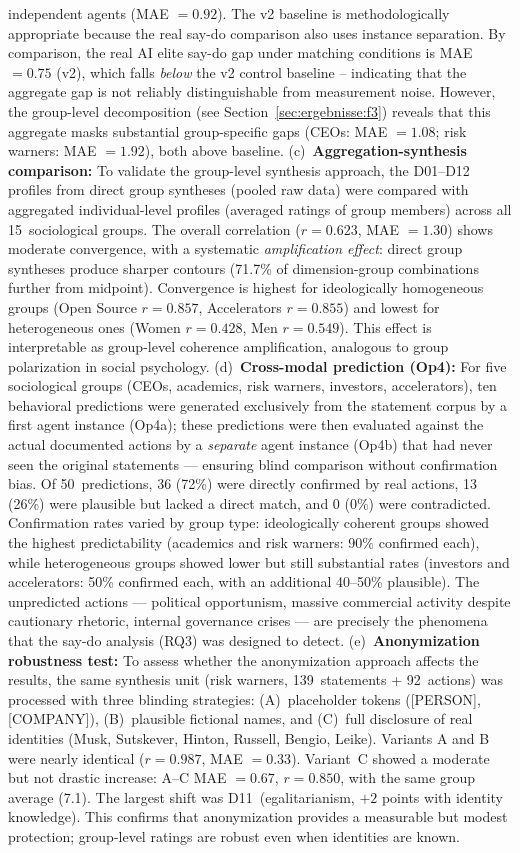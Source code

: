 \documentclass[12pt,a4paper]{article}
\begin{document}
independent agents (MAE $= 0.92$). The v2 baseline is methodologically appropriate because the real say-do comparison also uses instance separation. By comparison, the real AI elite say-do gap under matching conditions is MAE $= 0.75$ (v2), which falls \emph{below} the v2 control baseline -- indicating that the aggregate gap is not reliably distinguishable from measurement noise. However, the group-level decomposition (see Section~\ref{sec:ergebnisse:f3}) reveals that this aggregate masks substantial group-specific gaps (CEOs: MAE $= 1.08$; risk warners: MAE $= 1.92$), both above baseline. (c)~\textbf{Aggregation-synthesis comparison:} To validate the group-level synthesis approach, the D01--D12 profiles from direct group syntheses (pooled raw data) were compared with aggregated individual-level profiles (averaged ratings of group members) across all 15~sociological groups. The overall correlation ($r = 0.623$, MAE $= 1.30$) shows moderate convergence, with a systematic \emph{amplification effect}: direct group syntheses produce sharper contours (71.7\% of dimension-group combinations further from midpoint). Convergence is highest for ideologically homogeneous groups (Open Source $r = 0.857$, Accelerators $r = 0.855$) and lowest for heterogeneous ones (Women $r = 0.428$, Men $r = 0.549$). This effect is interpretable as group-level coherence amplification, analogous to group polarization in social psychology. (d)~\textbf{Cross-modal prediction (Op4):} For five sociological groups (CEOs, academics, risk warners, investors, accelerators), ten behavioral predictions were generated exclusively from the statement corpus by a first agent instance (Op4a); these predictions were then evaluated against the actual documented actions by a \emph{separate} agent instance (Op4b) that had never seen the original statements --- ensuring blind comparison without confirmation bias. Of 50~predictions, 36 (72\%) were directly confirmed by real actions, 13 (26\%) were plausible but lacked a direct match, and 0 (0\%) were contradicted. Confirmation rates varied by group type: ideologically coherent groups showed the highest predictability (academics and risk warners: 90\% confirmed each), while heterogeneous groups showed lower but still substantial rates (investors and accelerators: 50\% confirmed each, with an additional 40--50\% plausible). The unpredicted actions --- political opportunism, massive commercial activity despite cautionary rhetoric, internal governance crises --- are precisely the phenomena that the say-do analysis (RQ3) was designed to detect.
(e)~\textbf{Anonymization robustness test:} To assess whether the anonymization approach affects the results, the same synthesis unit (risk warners, 139~statements + 92~actions) was processed with three blinding strategies: (A)~placeholder tokens ([PERSON], [COMPANY]), (B)~plausible fictional names, and (C)~full disclosure of real identities (Musk, Sutskever, Hinton, Russell, Bengio, Leike). Variants A and B were nearly identical ($r = 0.987$, MAE $= 0.33$). Variant~C showed a moderate but not drastic increase: A--C MAE $= 0.67$, $r = 0.850$, with the same group average (7.1). The largest shift was D11~(egalitarianism, $+2$ points with identity knowledge). This confirms that anonymization provides a measurable but modest protection; group-level ratings are robust even when identities are known.
\end{document}
